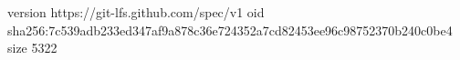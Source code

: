 version https://git-lfs.github.com/spec/v1
oid sha256:7c539adb233ed347af9a878c36e724352a7cd82453ee96c98752370b240c0be4
size 5322
